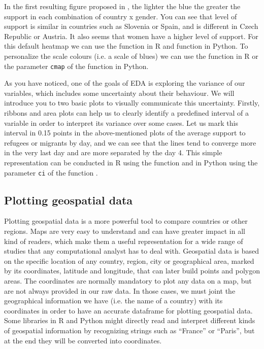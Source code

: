 In the first resulting figure proposed in , the lighter the blue the greater the support in each combination of country x gender. You can see that level of support is similar in countries such as Slovenia or Spain, and is different in Czech Republic or Austria. It also seems that women have a higher level of support. For this default heatmap we can use the  function  in R and  function  in Python.  To personalize the scale colours (i.e. a scale of blues) we can use the  function  in R or the parameter \texttt{cmap} of the  function  in Python. 


As you have noticed, one of the goals of EDA is exploring the variance of our variables, which includes some uncertainty about their behaviour. We will introduce you to two basic plots to visually communicate this uncertainty. Firstly, ribbons and area plots can help us to clearly identify a predefined interval of a variable in order to interpret its variance over some cases. Let us mark this interval in 0.15 points in the above-mentioned plots of the average support to refugees or migrants by day, and we can see that the lines tend to converge more in the very last day and are more separated by the day 4. This simple representation can be conducted in R using the  function  and in Python using the parameter \texttt{ci} of the  function .  





\subsection{Plotting geospatial data}

Plotting geospatial data is a more powerful tool to compare countries or other regions.  Maps are very easy to understand and can have greater impact in all kind of readers, which make them a useful representation for a wide range of studies that any computational analyst has to deal with. Geospatial data is based on the specific location of any country, region, city or geographical area, marked by its coordinates, latitude and longitude, that can later build points and polygon areas. The coordinates are normally mandatory to plot any data on a map, but are not always provided in our raw data. In those cases, we must joint the geographical information we have (i.e. the name of a country) with its coordinates in order to have an accurate dataframe for plotting geospatial data. Some libraries in R and Python might directly read and interpret different kinds of geospatial information by recognizing strings such as “France” or “Paris”, but at the end they will be converted into coordinates. 

